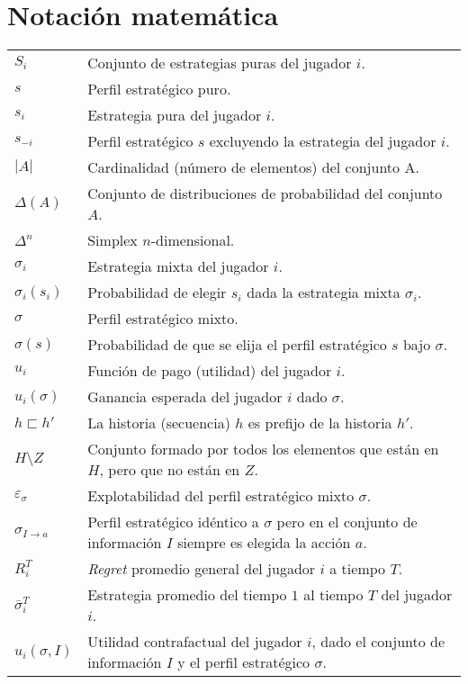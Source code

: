 \chapter*{Notación matemática}
\begingroup
\renewcommand{\arraystretch}{1.5}
\begin{tabular}{l p{12cm}}
$S_i$ & Conjunto de estrategias puras del jugador $i$. \\
$s$ & Perfil estratégico puro. \\
$s_i$ & Estrategia pura del jugador $i$. \\
$s_{-i}$ & Perfil estratégico $s$ excluyendo la estrategia del jugador $i$. \\
$|A|$ & Cardinalidad (número de elementos) del conjunto A. \\
$\Delta(A)$ & Conjunto de distribuciones de probabilidad del conjunto $A$. \\
$\Delta^n$ & Simplex $n$-dimensional. \\
$\sigma_i$ & Estrategia mixta del jugador $i$. \\
$\sigma_i(s_i)$ & Probabilidad de elegir $s_i$ dada la estrategia mixta $\sigma_i$. \\
$\sigma$ & Perfil estratégico mixto. \\
$\sigma(s)$ & Probabilidad de que se elija el perfil estratégico $s$ bajo $\sigma$. \\
$u_i$ & Función de pago (utilidad) del jugador $i$. \\
$u_i(\sigma)$ & Ganancia esperada del jugador $i$ dado $\sigma$. \\
$h \sqsubset h'$ & La historia (secuencia) $h$ es prefijo de la historia $h'$. \\
$H \setminus Z$ & Conjunto formado por todos los elementos que están en $H$, pero que no están en $Z$. \\
$\varepsilon_{\sigma}$ & Explotabilidad del perfil estratégico mixto $\sigma$. \\
$\sigma_{I \rightarrow a}$ & Perfil estratégico idéntico a $\sigma$ pero en el conjunto de información $I$ siempre es elegida la acción $a$. \\
$R_i^T$ & \textit{Regret} promedio general del jugador $i$ a tiempo $T$. \\
$\bar\sigma^T_i$ & Estrategia promedio del tiempo $1$ al tiempo $T$ del jugador $i$. \\
$u_i(\sigma, I)$ & Utilidad contrafactual del jugador $i$, dado el conjunto de información $I$ y el perfil estratégico $\sigma$.
\end{tabular}
\endgroup

